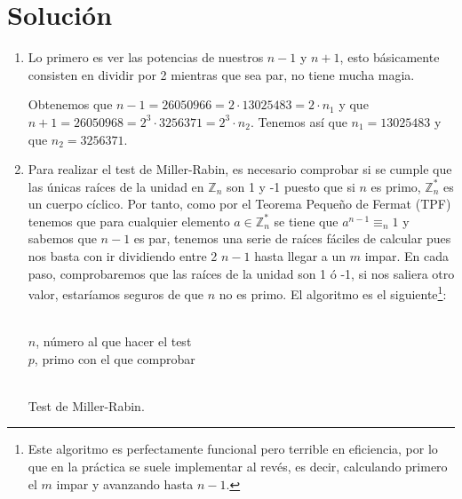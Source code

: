 \section*{Solución}
	\begin{enumerate}
		\item Lo primero es ver las potencias de nuestros $n-1$ y $n+1$, esto básicamente consisten en dividir
		por 2 mientras que sea par, no tiene mucha magia.
		
		Obtenemos que $n-1 = 26050966 = 2 \cdot 13025483 = 2 \cdot n_1$ y que $n+1 = 26050968 = 2^3 \cdot 3256371
		= 2^3 \cdot n_2$. Tenemos así que $n_1 = 13025483$ y que $n_2 = 3256371$.
		
		\item Para realizar el test de Miller-Rabin, es necesario comprobar si se cumple que las únicas raíces de
		la unidad en $\mathbb{Z}_n$ son 1 y -1 puesto que si $n$ es primo, $\mathbb{Z}^*_n$ es un cuerpo cíclico.
		Por tanto, como por el Teorema Pequeño de Fermat (TPF) tenemos que para cualquier elemento $a \in
		\mathbb{Z}^*_n$ se tiene que $a^{n-1} \equiv_n 1$ y sabemos que $n-1$ es par, tenemos una serie de raíces
		fáciles de calcular pues nos basta con ir dividiendo entre 2 $n-1$ hasta llegar a un $m$ impar. En cada
		paso, comprobaremos que las raíces de la unidad son 1 ó -1, si nos saliera otro valor, estaríamos seguros
		de que $n$ no es primo. El algoritmo es el siguiente\footnote{Este algoritmo es perfectamente funcional
		pero terrible en eficiencia, por lo que en la práctica se suele implementar al revés, es decir, calculando
		primero el $m$ impar y avanzando hasta $n-1$.}:
		
		\begin{algorithm}[H]
		\begin{algorithmic}[1]
			\REQUIRE \ \\
				\texttt{$n$}, número al que hacer el test \\
				\texttt{$p$}, primo con el que comprobar \\ \
			\ELSE
					\ENDIF
				\ENDWHILE
					\ELSE
					\ENDIF
				\ENDIF
			\ENDIF
		\end{algorithmic}
		\caption{Test de Miller-Rabin.}
		\label{Miller-Rabin}
		\end{algorithm}	
	\end{enumerate}